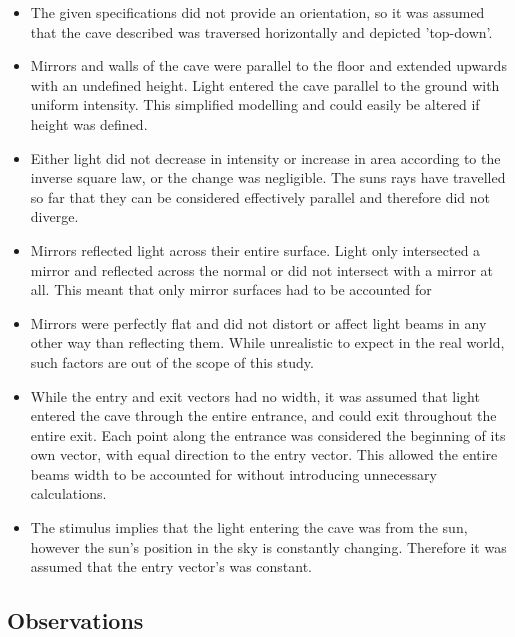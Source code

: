 \documentclass[11pt, letterpaper]{article}
\begin{document}
\begin{itemize}

	\item The given specifications did not provide an orientation, so it was assumed that the cave described was traversed horizontally and depicted 'top-down'.
	
	\item Mirrors and walls of the cave were parallel to the floor and extended upwards with an undefined height. Light entered the cave parallel to the ground with uniform intensity. This simplified modelling and could easily be altered if height was defined. 
	

	\item Either light did not decrease in intensity or increase in area according to the inverse square law, or the change was negligible. The suns rays have travelled so far that they can be considered effectively parallel and therefore did not diverge. 
	\cite{yasuda_2024_why}
		
	\item Mirrors reflected light across their entire surface. Light only intersected a mirror and reflected across the normal or did not intersect with a mirror at all. This meant that only mirror surfaces had to be accounted for
	
	\item Mirrors were perfectly flat and did not distort or affect light beams in any other way than reflecting them. While unrealistic to expect in the real world, such factors are out of the scope of this study.
	
	\item While the entry and exit vectors had no width, it was assumed that light entered the cave through the entire entrance, and could exit throughout the entire exit. Each point along the entrance was considered the beginning of its own vector, with equal direction to the entry vector.  This allowed the entire beams width to be accounted for without introducing unnecessary calculations. 
	
	\item The stimulus implies that the light entering the cave was from the sun, however the sun's position in the sky is constantly changing. Therefore it was assumed that the entry vector's was constant.
		


\end{itemize}

\subsection{Observations}
\par
\end{document}
